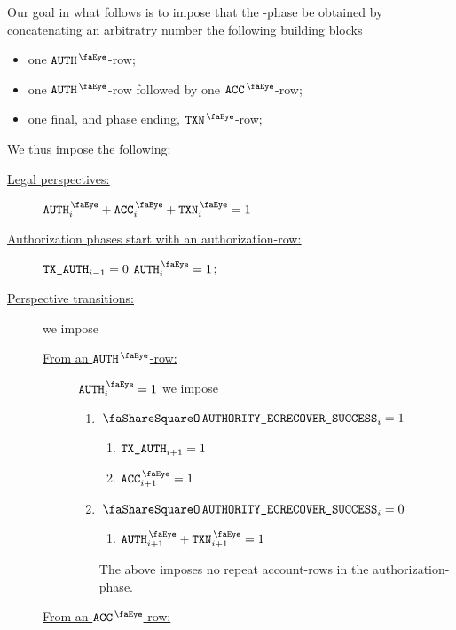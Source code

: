 \begin{center}
\end{center}
Our goal in what follows is to impose that the \txAuth{}-phase
be obtained by concatenating an arbitratry number the following building blocks
\begin{itemize}
	\item one $\peekAuthorization{}$-row;
	\item one $\peekAuthorization{}$-row followed by one $\peekAccount$-row;
	\item one final, and phase ending, $\peekTransaction{}$-row;
\end{itemize}
We thus impose the following:
\begin{description}
	\item[\underline{\underline{Legal perspectives:}}]
		$\peekAuthorization _{i} + \peekAccount _{i} + \peekTransaction _{i} = 1$
	\item[\underline{\underline{Authorization phases start with an authorization-row:}}]
		\If $\texttt{TX}\texttt{\_AUTH} _{i - 1} = 0$ \Then $\peekAuthorization _{i} = 1$;
	\item[\underline{\underline{Perspective transitions:}}]
		we impose
		\begin{description}
			\item[\underline{From an $\peekAuthorization$-row:}]\label{hub: authorization phase: perspectives: account row iff authority successfully ECRECOVER'ed}
				\If $\peekAuthorization _{i} = 1$ \Then we impose
				\begin{enumerate}
					\item \If $\authAuthorityEcrecoverSuccess _{i} = 1$ \Then
						\begin{enumerate}
							\item $\texttt{TX}\texttt{\_AUTH}      _{i + 1} = 1$
							\item $\peekAccount _{i + 1} = 1$
						\end{enumerate}
					\item \If $\authAuthorityEcrecoverSuccess _{i} = 0$ \Then
						\begin{enumerate}
							\item
								$\peekAuthorization _{i + 1}
								+\peekTransaction   _{i + 1} = 1$
						\end{enumerate}
						\saNote{}
						The above imposes no repeat account-rows in the authorization-phase.
				\end{enumerate}
			\item[\underline{From an $\peekAccount$-row:}]

\end{description}
\end{description}

